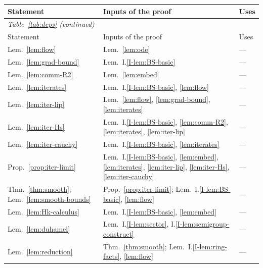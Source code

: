 \begingroup
\small
\captionsetup{type=table}
\caption{Dependencies of the statements on the path to Theorem~\ref{thm:main}, and the parts of Hypothesis~I.\ref{I-hyp:N} that they use.}
\label{tab:deps}
\setlength{\LTleft}{0pt}\setlength{\LTright}{\fill}\setlength{\LTpre}{0pt}
\begin{longtable}{p{}p{}p{}}
Statement & Inputs of the proof & Uses \\
\hline
\endfirsthead
\multicolumn{3}{l}{\emph{Table~\ref{tab:deps} (continued)}} \\
Statement & Inputs of the proof & Uses \\
\hline
\endhead
\raggedright Lem.~\ref{lem:flow}
  & \raggedright Lem.~\ref{lem:ode} & --- \\
\raggedright Lem.~\ref{lem:grad-bound}
  & \raggedright Lem.~I.\ref{I-lem:BS-basic} & --- \\
\raggedright Lem.~\ref{lem:comm-R2}
  & \raggedright Lem.~\ref{lem:embed} & --- \\
\raggedright Lem.~\ref{lem:iterates}
  & \raggedright Lem.~I.\ref{I-lem:BS-basic}, \ref{lem:flow} & --- \\
\raggedright Lem.~\ref{lem:iter-lip}
  & \raggedright Lem.~\ref{lem:flow}, \ref{lem:grad-bound}, \ref{lem:iterates} & --- \\
\raggedright Lem.~\ref{lem:iter-Hs}
  & \raggedright Lem.~I.\ref{I-lem:BS-basic}, \ref{lem:comm-R2}, \ref{lem:iterates}, \ref{lem:iter-lip} & --- \\
\raggedright Lem.~\ref{lem:iter-cauchy}
  & \raggedright Lem.~I.\ref{I-lem:BS-basic}, \ref{lem:iterates} & --- \\
\raggedright Prop.~\ref{prop:iter-limit}
  & \raggedright Lem.~I.\ref{I-lem:BS-basic}, \ref{lem:embed}, \ref{lem:iterates}, \ref{lem:iter-lip}, \ref{lem:iter-Hs}, \ref{lem:iter-cauchy} & --- \\
\raggedright Thm.~\ref{thm:smooth}; Lem.~\ref{lem:smooth-bounds}
  & \raggedright Prop.~\ref{prop:iter-limit}; Lem.~I.\ref{I-lem:BS-basic}, \ref{lem:flow} & --- \\
\raggedright Lem.~\ref{lem:Hk-calculus}
  & \raggedright Lem.~I.\ref{I-lem:BS-basic}, \ref{lem:embed} & --- \\
\raggedright Lem.~\ref{lem:duhamel}
  & \raggedright Lem.~I.\ref{I-lem:sector}, I.\ref{I-lem:semigroup-construct} & --- \\
\raggedright Lem.~\ref{lem:reduction}
  & \raggedright Thm.~\ref{thm:smooth}; Lem.~I.\ref{I-lem:ring-facts}, \ref{lem:flow} & --- \\

\end{longtable}
